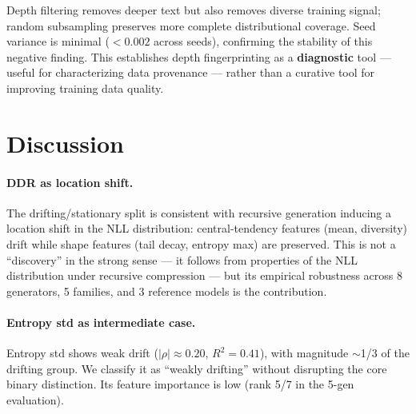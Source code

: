 \documentclass[11pt,twocolumn]{article}
\begin{document}
Depth filtering removes deeper text but also removes diverse training signal; random subsampling preserves more complete distributional coverage.
Seed variance is minimal ($< 0.002$ across seeds), confirming the stability of this negative finding.
This establishes depth fingerprinting as a \textbf{diagnostic} tool --- useful for characterizing data provenance --- rather than a curative tool for improving training data quality.

\section{Discussion}

\paragraph{DDR as location shift.}
The drifting/stationary split is consistent with recursive generation inducing a location shift in the NLL distribution: central-tendency features (mean, diversity) drift while shape features (tail decay, entropy max) are preserved.
This is not a ``discovery'' in the strong sense --- it follows from properties of the NLL distribution under recursive compression --- but its empirical robustness across 8 generators, 5 families, and 3 reference models is the contribution.

\paragraph{Entropy std as intermediate case.}
Entropy std shows weak drift ($|\rho| \approx 0.20$, $R^2 = 0.41$), with magnitude $\sim$1/3 of the drifting group.
We classify it as ``weakly drifting'' without disrupting the core binary distinction.
Its feature importance is low (rank 5/7 in the 5-gen evaluation).
\end{document}
